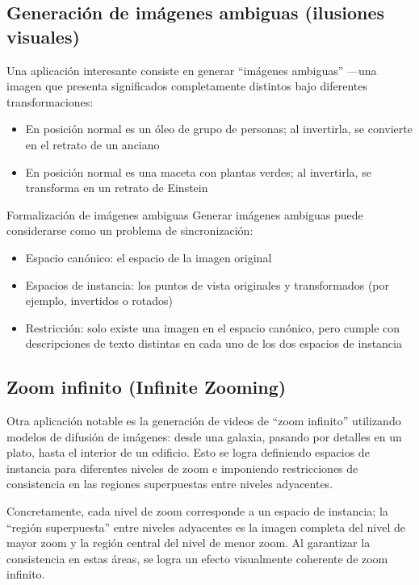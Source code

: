 \documentclass[a4paper]{article}
\begin{document}
\subsection{Generación de imágenes ambiguas (ilusiones visuales)}

Una aplicación interesante consiste en generar ``imágenes ambiguas'' —una imagen que presenta significados completamente distintos bajo diferentes transformaciones:
\begin{itemize}
    \item En posición normal es un óleo de grupo de personas; al invertirla, se convierte en el retrato de un anciano
    \item En posición normal es una maceta con plantas verdes; al invertirla, se transforma en un retrato de Einstein
\end{itemize}

\begin{knowledgebox}{Formalización de imágenes ambiguas}
Generar imágenes ambiguas puede considerarse como un problema de sincronización:
\begin{itemize}
    \item Espacio canónico: el espacio de la imagen original
    \item Espacios de instancia: los puntos de vista originales y transformados (por ejemplo, invertidos o rotados)
    \item Restricción: solo existe una imagen en el espacio canónico, pero cumple con descripciones de texto distintas en cada uno de los dos espacios de instancia
\end{itemize}
\end{knowledgebox}

\subsection{Zoom infinito (Infinite Zooming)}

Otra aplicación notable es la generación de videos de ``zoom infinito'' utilizando modelos de difusión de imágenes: desde una galaxia, pasando por detalles en un plato, hasta el interior de un edificio. Esto se logra definiendo espacios de instancia para diferentes niveles de zoom e imponiendo restricciones de consistencia en las regiones superpuestas entre niveles adyacentes.

Concretamente, cada nivel de zoom corresponde a un espacio de instancia; la ``región superpuesta'' entre niveles adyacentes es la imagen completa del nivel de mayor zoom y la región central del nivel de menor zoom. Al garantizar la consistencia en estas áreas, se logra un efecto visualmente coherente de zoom infinito.
\end{document}
